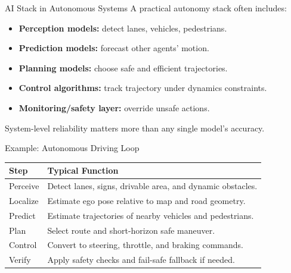 \documentclass[10pt]{beamer}
\begin{document}
\begin{frame}{AI Stack in Autonomous Systems}
    A practical autonomy stack often includes:
    \begin{itemize}
        \item \textbf{Perception models:} detect lanes, vehicles, pedestrians.
        \item \textbf{Prediction models:} forecast other agents' motion.
        \item \textbf{Planning models:} choose safe and efficient trajectories.
        \item \textbf{Control algorithms:} track trajectory under dynamics constraints.
        \item \textbf{Monitoring/safety layer:} override unsafe actions.
    \end{itemize}

    \vspace{0.2cm}
    System-level reliability matters more than any single model's accuracy.
\end{frame}

\begin{frame}{Example: Autonomous Driving Loop}
    \small
    \setlength{\tabcolsep}{7pt}
    \renewcommand{\arraystretch}{1.2}
    \begin{tabular}{>{\raggedright\arraybackslash}p{2.8cm} >{\raggedright\arraybackslash}p{7.2cm}}
        \toprule
        \textbf{Step} & \textbf{Typical Function} \\
        \midrule
        Perceive & Detect lanes, signs, drivable area, and dynamic obstacles. \\
        Localize & Estimate ego pose relative to map and road geometry. \\
        Predict & Estimate trajectories of nearby vehicles and pedestrians. \\
        Plan & Select route and short-horizon safe maneuver. \\
        Control & Convert to steering, throttle, and braking commands. \\
        Verify & Apply safety checks and fail-safe fallback if needed. \\
        \bottomrule
    \end{tabular}
\end{frame}
\end{document}

